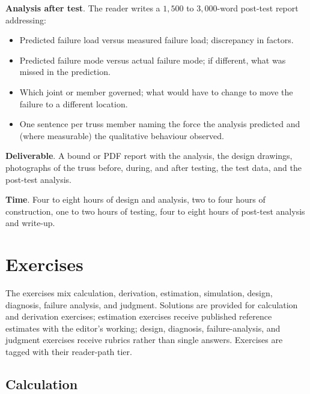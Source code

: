 \begin{project}
\textbf{Analysis after test}. The reader writes a $1{,}500$ to
$3{,}000$-word post-test report addressing:

\begin{itemize}[leftmargin=*]
  \item Predicted failure load versus measured failure load;
    discrepancy in factors.
  \item Predicted failure mode versus actual failure mode; if
    different, what was missed in the prediction.
  \item Which joint or member governed; what would have to change
    to move the failure to a different location.
  \item One sentence per truss member naming the force the analysis
    predicted and (where measurable) the qualitative behaviour
    observed.
\end{itemize}

\textbf{Deliverable}. A bound or PDF report with the analysis, the
design drawings, photographs of the truss before, during, and after
testing, the test data, and the post-test analysis.

\textbf{Time}. Four to eight hours of design and analysis, two to
four hours of construction, one to two hours of testing, four to
eight hours of post-test analysis and write-up.
\end{project}

\section{Exercises}

The exercises mix calculation, derivation, estimation, simulation,
design, diagnosis, failure analysis, and judgment. Solutions are
provided for calculation and derivation exercises; estimation
exercises receive published reference estimates with the editor's
working; design, diagnosis, failure-analysis, and judgment exercises
receive rubrics rather than single answers. Exercises are tagged
with their reader-path tier.

\subsection*{Calculation}

